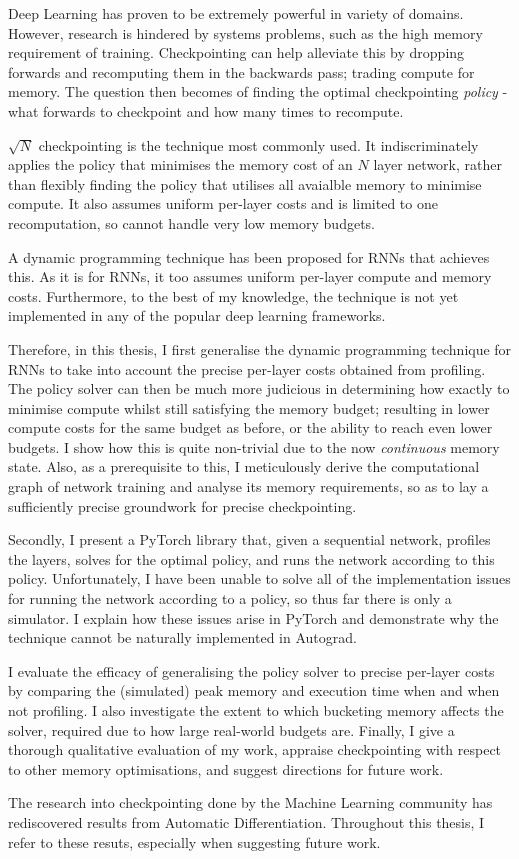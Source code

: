 \small
Deep Learning has proven to be extremely powerful in variety of domains.
However, research is hindered by systems problems, such as the high memory requirement of training.
Checkpointing can help alleviate this by dropping forwards and recomputing them in the backwards pass; trading compute for memory.
The question then becomes of finding the optimal checkpointing \textit{policy} - what forwards to checkpoint and how many times to recompute.

\(\sqrt{N}\) checkpointing is the technique most commonly used.
It indiscriminately applies the policy that minimises the memory cost of an \(N\) layer network, rather than flexibly finding the policy that utilises all avaialble memory to minimise compute.
It also assumes uniform per-layer costs and is limited to one recomputation, so cannot handle very low memory budgets. 

A dynamic programming technique has been proposed for RNNs that achieves this.
As it is for RNNs, it too assumes uniform per-layer compute and memory costs.
Furthermore, to the best of my knowledge, the technique is not yet implemented in any of the popular deep learning frameworks.

Therefore, in this thesis, I first generalise the dynamic programming technique for RNNs to take into account the precise per-layer costs obtained from profiling.
The policy solver can then be much more judicious in determining how exactly to minimise compute whilst still satisfying the memory budget; resulting in lower compute costs for the same budget as before, or the ability to reach even lower budgets.
I show how this is quite non-trivial due to the now \textit{continuous} memory state.
Also, as a prerequisite to this, I meticulously derive the computational graph of network training and analyse its memory requirements, so as to lay a sufficiently precise groundwork for precise checkpointing.

Secondly, I present a PyTorch library that, given a sequential network, profiles the layers, solves for the optimal policy, and runs the network according to this policy.
Unfortunately, I have been unable to solve all of the implementation issues for running the network according to a policy, so thus far there is only a simulator.
I explain how these issues arise in PyTorch and demonstrate why the technique cannot be naturally implemented in Autograd.

I evaluate the efficacy of generalising the policy solver to precise per-layer costs by comparing the (simulated) peak memory and execution time
when and when not profiling.
I also investigate the extent to which bucketing memory affects the solver, required due to how large real-world budgets are.
Finally, I give a thorough qualitative evaluation of my work, appraise checkpointing with respect to other memory optimisations, and suggest directions for future work.

The research into checkpointing done by the Machine Learning community has rediscovered results from Automatic Differentiation.
Throughout this thesis, I refer to these resuts, especially when suggesting future work.